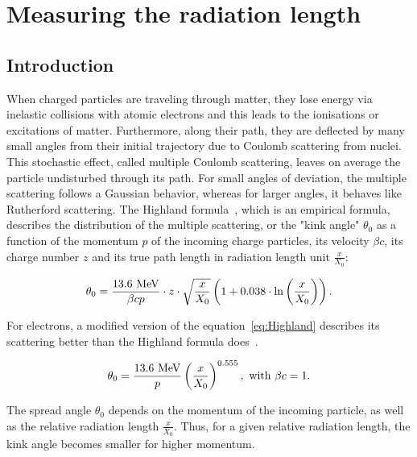   \section{Measuring the radiation length}

    \subsection{Introduction}
    
    When charged particles are traveling through matter, they lose energy via inelastic collisions with atomic electrons and this leads to the ionisations or excitations of matter.
    Furthermore, along their path, they are deflected by many small angles from their initial trajectory due to Coulomb scattering from nuclei. 
    This stochastic effect, called multiple Coulomb scattering, leaves on average the particle undisturbed through its path. 
    For small angles of deviation, the multiple scattering follows a Gaussian behavior, whereas for larger angles, it behaves like Rutherford scattering.
    The Highland formula~\cite{Highland:1975pq}, which is an empirical formula, describes the distribution of the multiple scattering, or the "kink angle" $\theta_0$ as a function of the momentum $p$ of the incoming charge particles, its velocity $\beta c$, its charge number $z$ and its true path length in radiation length unit $\frac{x}{X_{0}}$:

    \begin{equation}
      \theta_{0} = \frac{13.6~\rm{MeV}}{\beta c p}\cdot z \cdot \sqrt{\frac{x}{X_{0}}}\left(1 + 0.038 \cdot \ln{\left(\frac{x}{X_{0}}\right)}\right).
      \label{eq:Highland}
    \end{equation}

    For electrons, a modified version of the equation~\ref{eq:Highland} describes its scattering better than the Highland formula does~\cite{GEANT4}.

    \begin{equation}
      \theta_{0} = \frac{13.6~\rm{MeV}}{p}\left(\frac{x}{X_{0}}\right)^{0.555},~\text{with $\beta c = 1$.}
      \label{eq:theta0}
    \end{equation}

    The spread angle $\theta_{0}$ depends on the momentum of the incoming particle, as well as the relative radiation length $\frac{x}{X_{0}}$.
    Thus, for a given relative radiation length, the kink angle becomes smaller for higher momentum.

